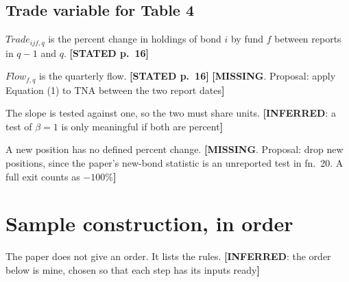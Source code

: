 \documentclass[10pt,a4paper]{article}
\newcommand{\ST}[1]{\textcolor{cst}{\textbf{[STATED #1]}}}
\newcommand{\IN}[1]{\textcolor{cin}{\textbf{[INFERRED}: #1\textbf{]}}}
\newcommand{\MI}[1]{\textcolor{cmi}{\textbf{[MISSING}. Proposal: #1\textbf{]}}}
\begin{document}
\subsection{Trade variable for Table 4}
$\mathit{Trade}_{ijf,q}$ is the percent change in holdings of bond $i$ by fund $f$ between reports in $q-1$ and $q$. \ST{p.~16}

$\mathit{Flow}_{f,q}$ is the quarterly flow. \ST{p.~16} \MI{apply Equation (1) to TNA between the two report dates}

The slope is tested against one, so the two must share units. \IN{a test of $\beta=1$ is only meaningful if both are percent}

A new position has no defined percent change. \MI{drop new positions, since the paper's new-bond statistic is an unreported test in fn.~20. A full exit counts as $-100\%$}
\section{Sample construction, in order}\label{sec:steps}

The paper does not give an order. It lists the rules. \IN{the order below is mine, chosen so that each step has its inputs ready}
\end{document}
